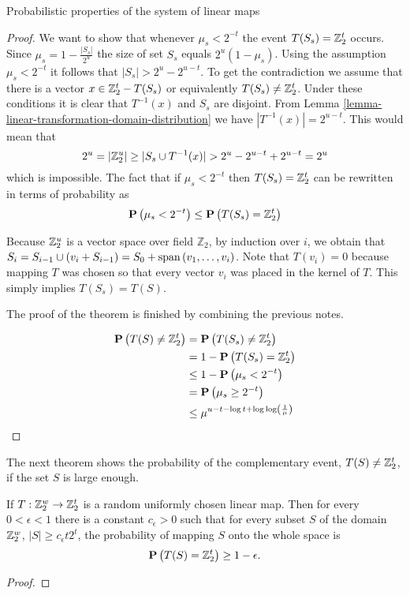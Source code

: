 \begin{section}{Probabilistic properties of the system of linear maps}
\begin{proof}
We want to show that whenever $\mu_s < 2^{-t}$ the event $T(S_s) = \mathbb{Z}_{2}^{t}$ occurs. Since $\mu_s = 1 - \frac{|S_s|}{2 ^ u}$ the size of set $S_s$ equals ${2 ^ u}(1 - \mu_s)$. Using the assumption $\mu_s < 2 ^ {-t}$ it follows that $|S_s| > 2^u - 2^{u - t}$. To get the contradiction we assume that there is a vector $x \in \mathbb{Z}_{2}^{t} - T(S_s)$ or equivalently $T(S_s) \neq \mathbb{Z}_{2}^{t}$. Under these conditions it is clear that $T ^ {-1}(x)$ and $S_s$ are disjoint. From Lemma \ref{lemma-linear-transformation-domain-distribution} we have $|T ^ {-1}(x)| = 2 ^ {u - t}$. This would mean that
\[
2 ^ u = |\mathbb{Z}_{2}^{u}| \geq |S_s \cup T^{-1}(x)| > 2 ^ u - 2 ^ {u - t} + 2 ^ {u - t} = 2 ^u
\] which is impossible. The fact that if $\mu_s < 2^{-t}$ then $T(S_s) = \mathbb{Z}_{2}^{t}$ can be rewritten in terms of probability as
\[
	\mathbf{P}\left(\mu_s < 2^{-t}\right) \leq \mathbf{P}\left(T(S_s) = \mathbb{Z}_{2}^{t}\right)
\]

Because $\mathbb{Z}_{2}^{u}$ is a vector space over field $\mathbb{Z}_2$, by induction over $i$, we obtain that $S_i = S_{i - 1} \cup (v_i + S_{i - 1}) = S_0 + \mathrm{span}\left({v_1, \dots, v_i}\right)$. Note that $T(v_i) = 0$ because mapping $T$ was chosen so that every vector $v_i$ was placed in the kernel of $T$. This simply implies $T(S_s) = T(S)$.

The proof of the theorem is finished by combining the previous notes.

\[
\begin{split}
\mathbf{P}\left(T(S) \neq \mathbb{Z}_{2}^{t}\right) 
	& = \mathbf{P}\left(T(S_s) \neq \mathbb{Z}_{2}^{t}\right)  \\
	& = 1 - \mathbf{P}\left(T(S_s) = \mathbb{Z}_{2}^{t}\right) \\
	& \leq 1 - \mathbf{P}\left(\mu_s < 2 ^ {-t}\right) \\
	& = \mathbf{P}\left(\mu_s \geq 2 ^ {-t}\right) \\
	& \leq \mu ^ {u - t - \log t + \log \log \left(\frac{1}{\mu}\right)} \\
\end{split}
\]
\end{proof}

The next theorem shows the probability of the complementary event, $T(S) \neq \mathbb{Z}_{2}^{t}$, if the set $S$ is large enough.
\begin{theorem}
\label{theorem-set-onto-by-linear-transform}
If $T: \mathbb{Z}_{2}^{w} \rightarrow \mathbb{Z}_{2}^{t}$ is a random uniformly chosen linear map. Then for every $0 < \epsilon < 1$ there is a constant $c_\epsilon > 0$ such that for every subset $S$ of the domain $\mathbb{Z}_{2}^{w}$, $|S| \geq c_\epsilon t 2^t$, the probability of mapping $S$ onto the whole space is
\[
	\mathbf{P}\left(T(S) = \mathbb{Z}_{2}^{t}\right) \geq 1 - \epsilon \text{.}
\]
\end{theorem}
\begin{proof}

\end{proof}


\end{section}
